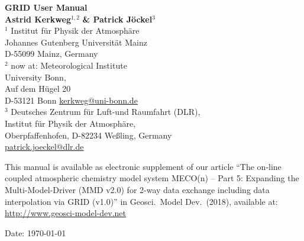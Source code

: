 \documentclass[11pt,twoside]{article}
\begin{document}
\thispagestyle{empty}
\vspace*{2cm}
\begin{center}
  {\Huge\bf GRID User Manual}\\[12mm]

\vspace*{2cm}
  {\huge\bf Astrid Kerkweg$^{1,2}$ } 
  {\huge\bf \& Patrick J\"ockel$^3$}\\[9mm]
  \Large
\vspace*{1.5cm}
  $^1$ Institut f\"ur Physik der Atmosph\"are\\
  Johannes Gutenberg Universit\"at Mainz\\
  D-55099 Mainz, Germany\\
  $^2$ now at:  Meteorological  Institute\\
    University Bonn,\\
  Auf dem H\"ugel 20\\ D-53121 Bonn
  \url{kerkweg@uni-bonn.de} \\[0.35cm]

  $^3$ Deutsches Zentrum f\"ur Luft-und Raumfahrt (DLR),\\
   Institut f\"ur Physik der Atmosph\"are, \\
    Oberpfaffenhofen, D-82234 We\ss ling, Germany \\
  \url{patrick.joeckel@dlr.de}


\end{center}

\vfill
{\large This manual is available as electronic supplement of our article
  ``The on-line coupled atmospheric chemistry model system MECO(n)
  – Part 5: Expanding the Multi-Model-Driver (MMD v2.0) for 2-way data
  exchange including data interpolation via GRID (v1.0)'' 
  in Geosci.\ Model Dev.\ 
  (2018), available at: \url{http://www.geosci-model-dev.net}}

\begin{center}
  Date: \today
\end{center}

\newpage %
\cleardoublepage

\sloppy

\tableofcontents
\clearpage




\end{document}

